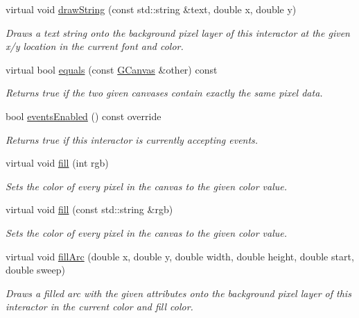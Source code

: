 \begin{DoxyCompactItemize}
virtual void \mbox{\hyperlink{classGDrawingSurface_ad4e8551a753a77135792bbee97013675}{draw\+String}} (const std\+::string \&text, double x, double y)
\begin{DoxyCompactList}\small\item\em Draws a text string onto the background pixel layer of this interactor at the given x/y location in the current font and color. \end{DoxyCompactList}\item 
virtual bool \mbox{\hyperlink{classGCanvas_a7cf0de4c4124b7de747b9cc17edd6ab9}{equals}} (const \mbox{\hyperlink{classGCanvas}{G\+Canvas}} \&other) const
\begin{DoxyCompactList}\small\item\em Returns true if the two given canvases contain exactly the same pixel data. \end{DoxyCompactList}\item 
bool \mbox{\hyperlink{classGInteractor_a597a370b592e3737d38d9d2f4e2031ea}{events\+Enabled}} () const override
\begin{DoxyCompactList}\small\item\em Returns true if this interactor is currently accepting events. \end{DoxyCompactList}\item 
virtual void \mbox{\hyperlink{classGCanvas_acaf90d64e4fea8f776e722976aeb5070}{fill}} (int rgb)
\begin{DoxyCompactList}\small\item\em Sets the color of every pixel in the canvas to the given color value. \end{DoxyCompactList}\item 
virtual void \mbox{\hyperlink{classGCanvas_a02a5aa7f1474eeedd181e6e46b5eee65}{fill}} (const std\+::string \&rgb)
\begin{DoxyCompactList}\small\item\em Sets the color of every pixel in the canvas to the given color value. \end{DoxyCompactList}\item 
virtual void \mbox{\hyperlink{classGDrawingSurface_a228075ad18bd97b57f9956568c4773f3}{fill\+Arc}} (double x, double y, double width, double height, double start, double sweep)
\begin{DoxyCompactList}\small\item\em Draws a filled arc with the given attributes onto the background pixel layer of this interactor in the current color and fill color. \end{DoxyCompactList}\item 

\end{DoxyCompactItemize}
